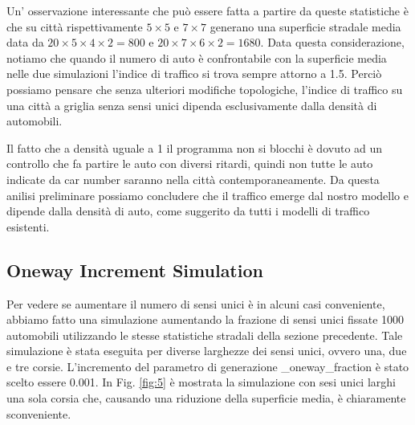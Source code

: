 \documentclass{article}
\begin{document}
        Un' osservazione interessante che può essere fatta a partire da queste statistiche è che su città rispettivamente
        $5 \times 5$ e $7 \times 7$ generano una superficie stradale media data da $20 \times 5 \times 4 \times 2 = 800$ e
        $20 \times 7 \times 6 \times 2 = 1680$. Data questa considerazione, notiamo che quando il numero di auto è confrontabile con 
        la superficie media nelle due simulazioni l'indice di traffico si trova sempre attorno a 1.5.
        Perciò possiamo pensare che senza ulteriori modifiche topologiche, l'indice di traffico su una città a griglia
        senza sensi unici dipenda esclusivamente dalla densità di automobili.

        Il fatto che a densità uguale a 1 il programma non si blocchi è dovuto ad un controllo che fa partire le auto con diversi ritardi,
        quindi non tutte le auto indicate da car number saranno nella città contemporaneamente.
        Da questa anilisi preliminare possiamo concludere che il traffico emerge dal nostro modello e dipende dalla densità di auto,
        come suggerito da tutti i modelli di traffico esistenti.

    \subsection{Oneway Increment Simulation}
        Per vedere se aumentare il numero di sensi unici è in alcuni casi conveniente, abbiamo fatto una simulazione aumentando la frazione di sensi unici 
        fissate 1000 automobili utilizzando le stesse statistiche stradali della sezione precedente. Tale simulazione è stata eseguita per diverse larghezze dei sensi unici, ovvero una, due e tre corsie.
        L'incremento del parametro di generazione \_oneway\_fraction è stato scelto essere 0.001.
        In Fig. \ref{fig:5} è mostrata la simulazione con sesi unici larghi una sola corsia che, causando una riduzione della superficie media, è chiaramente sconveniente.
        
\end{document}
